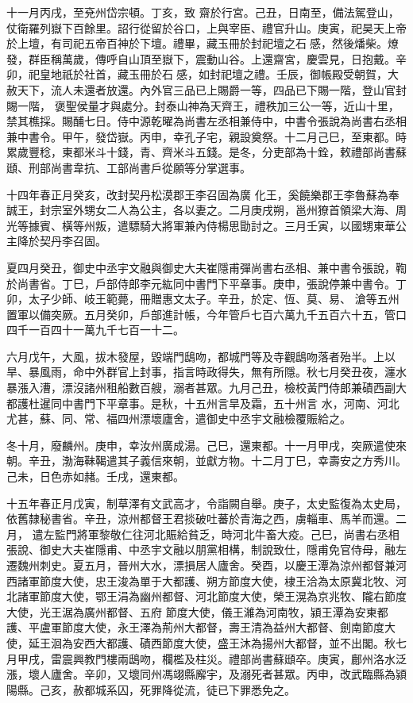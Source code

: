 \begin{pinyinscope}
 十一月丙戌，至兗州岱宗頓。丁亥，致
 齋於行宮。己丑，日南至，備法駕登山，仗衛羅列嶽下百餘里。詔行從留於谷口，上與宰臣、禮官升山。庚寅，祀昊天上帝於上壇，有司祀五帝百神於下壇。禮畢，藏玉冊於封祀壇之石感，然後燔柴。燎發，群臣稱萬歲，傳呼自山頂至嶽下，震動山谷。上還齋宮，慶雲見，日抱戴。辛卯，祀皇地祇於社首，藏玉冊於石感，如封祀壇之禮。壬辰，御帳殿受朝賀，大赦天下，流人未還者放還。內外官三品已上賜爵一等，四品已下賜一階，登山官封賜一階，
 褒聖侯量才與處分。封泰山神為天齊王，禮秩加三公一等，近山十里，禁其樵採。賜酺七日。侍中源乾曜為尚書左丞相兼侍中，中書令張說為尚書右丞相兼中書令。甲午，發岱嶽。丙申，幸孔子宅，親設奠祭。十二月己巳，至東都。時累歲豐稔，東都米斗十錢，青、齊米斗五錢。是冬，分吏部為十銓，敕禮部尚書蘇頲、刑部尚書韋抗、工部尚書戶從願等分掌選事。



 十四年春正月癸亥，改封契丹松漠郡王李召固為廣
 化王，奚饒樂郡王李魯蘇為奉誠王，封宗室外甥女二人為公主，各以妻之。二月庚戌朔，邕州獠首領梁大海、周光等據賓、橫等州叛，遣驃騎大將軍兼內侍楊思勖討之。三月壬寅，以國甥東華公主降於契丹李召固。



 夏四月癸丑，御史中丞宇文融與御史大夫崔隱甫彈尚書右丞相、兼中書令張說，鞫於尚書省。丁巳，戶部侍郎李元紘同中書門下平章事。庚申，張說停兼中書令。丁卯，太子少師、岐王範薨，冊贈惠文太子。辛丑，於定、恆、莫、易、
 滄等五州置軍以備突厥。五月癸卯，戶部進計帳，今年管戶七百六萬九千五百六十五，管口四千一百四十一萬九千七百一十二。



 六月戊午，大風，拔木發屋，毀端門鴟吻，都城門等及寺觀鴟吻落者殆半。上以旱、暴風雨，命中外群官上封事，指言時政得失，無有所隱。秋七月癸丑夜，瀍水暴漲入漕，漂沒諸州租船數百艘，溺者甚眾。九月己丑，檢校黃門侍郎兼磧西副大都護杜暹同中書門下平章事。是秋，十五州言旱及霜，五十州言
 水，河南、河北尤甚，蘇、同、常、福四州漂壞廬舍，遣御史中丞宇文融檢覆賑給之。



 冬十月，廢麟州。庚申，幸汝州廣成湯。己巳，還東都。十一月甲戌，突厥遣使來朝。辛丑，渤海靺鞨遣其子義信來朝，並獻方物。十二月丁巳，幸壽安之方秀川。己未，日色赤如赭。壬戌，還東都。



 十五年春正月戊寅，制草澤有文武高才，令詣闕自舉。庚子，太史監復為太史局，依舊隸秘書省。辛丑，涼州都督王君掞破吐蕃於青海之西，虜輜車、馬羊而還。二月，
 遣左監門將軍黎敬仁往河北賑給貧乏，時河北牛畜大疫。己巳，尚書右丞相張說、御史大夫崔隱甫、中丞宇文融以朋黨相構，制說致仕，隱甫免官侍母，融左遷魏州刺史。夏五月，晉州大水，漂損居人廬舍。癸酉，以慶王潭為涼州都督兼河西諸軍節度大使，忠王浚為單于大都護、朔方節度大使，棣王洽為太原冀北牧、河北諸軍節度大使，鄂王涓為幽州都督、河北節度大使，榮王滉為京兆牧、隴右節度大使，光王涺為廣州都督、五府
 節度大使，儀王濰為河南牧，潁王潭為安東都護、平盧軍節度大使，永王澤為荊州大都督，壽王清為益州大都督、劍南節度大使，延王洄為安西大都護、磧西節度大使，盛王沐為揚州大都督，並不出閣。秋七月甲戌，雷震興教門樓兩鴟吻，欄檻及柱災。禮部尚書蘇頲卒。庚寅，鄜州洛水泛漲，壞人廬舍。辛卯，又壞同州馮翊縣廨宇，及溺死者甚眾。丙申，改武臨縣為潁陽縣。己亥，赦都城系囚，死罪降從流，徒已下罪悉免之。




\end{pinyinscope}
